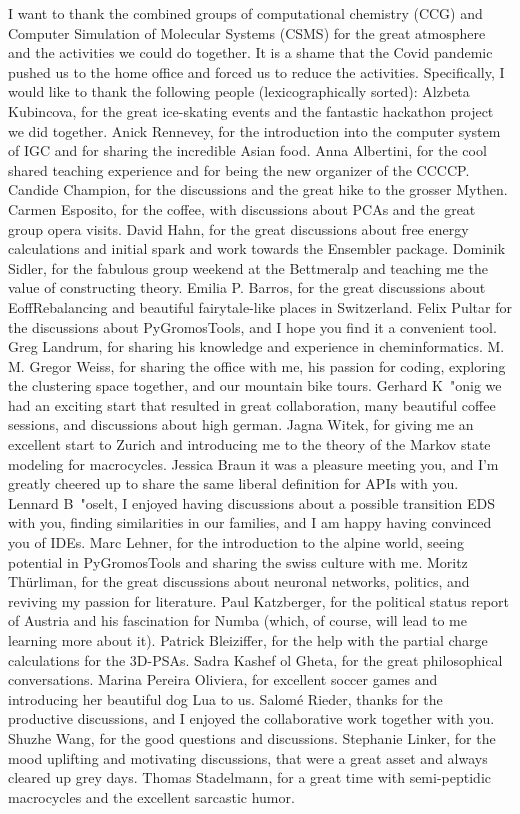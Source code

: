 I want to thank the combined groups of computational chemistry (CCG) and Computer Simulation of Molecular Systems (CSMS) for the great atmosphere and the activities we could do together. It is a shame that the Covid pandemic pushed us to the home office and forced us to reduce the activities.
Specifically, I would like to thank the following people (lexicographically sorted):
Alzbeta Kubincova, for the great ice-skating events and the fantastic hackathon project we did together.
Anick Rennevey, for the introduction into the computer system of IGC and for sharing the incredible Asian food.
Anna Albertini, for the cool shared teaching experience and for being the new organizer of the CCCCP.
Candide Champion,  for the discussions and the great hike to the grosser Mythen.
Carmen Esposito, for the coffee, with discussions about PCAs and the great group opera visits.
David Hahn, for the great discussions about free energy calculations and initial spark and work towards the Ensembler package.
Dominik Sidler, for the fabulous group weekend at the Bettmeralp and teaching me the value of constructing theory.
Emilia P. Barros, for the great discussions about EoffRebalancing and beautiful fairytale-like places in Switzerland.
Felix Pultar for the discussions about PyGromosTools, and I hope you find it a convenient tool.
Greg Landrum, for sharing his knowledge and experience in cheminformatics.
M. M. Gregor Weiss, for sharing the office with me, his passion for coding, exploring the clustering space together, and our mountain bike tours.
Gerhard K{\ "o}nig we had an exciting start that resulted in great collaboration, many beautiful coffee sessions, and discussions about high german.
Jagna Witek, for giving me an excellent start to Zurich and introducing me to the theory of the Markov state modeling for macrocycles.
Jessica Braun it was a pleasure meeting you, and I'm greatly cheered up to share the same liberal definition for APIs with you.
Lennard B{\ "o}selt, I enjoyed having discussions about a possible transition EDS with you, finding similarities in our families, and I am happy having convinced you of IDEs.
Marc Lehner, for the introduction to the alpine world, seeing potential in PyGromosTools and sharing the swiss culture with me.
Moritz Th{\"u}rliman, for the great discussions about neuronal networks, politics, and reviving my passion for literature.
Paul Katzberger, for the political status report of Austria and his fascination for Numba (which, of course, will lead to me learning more about it).
Patrick Bleiziffer, for the help with the partial charge calculations for the 3D-PSAs.
Sadra Kashef ol Gheta, for the great philosophical conversations.
Marina Pereira Oliviera, for excellent soccer games and introducing her beautiful dog Lua to us.
Salom{\' e} Rieder, thanks for the productive discussions, and I enjoyed the collaborative work together with you.
Shuzhe Wang, for the good questions and discussions.
Stephanie Linker, for the mood uplifting and motivating discussions, that were a great asset and always cleared up grey days.
Thomas Stadelmann, for a great time with semi-peptidic macrocycles and the excellent sarcastic humor.



